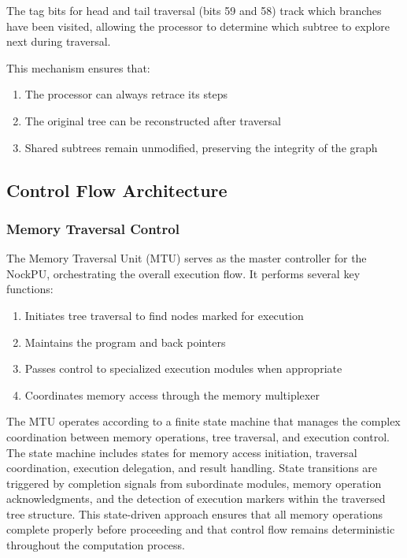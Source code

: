 \documentclass[twoside]{article}
\begin{document}
The tag bits for head and tail traversal (bits 59 and 58) track which branches have been visited, allowing the processor to determine which subtree to explore next during traversal.

This mechanism ensures that:
\begin{enumerate}
  \item The processor can always retrace its steps
  \item The original tree can be reconstructed after traversal
  \item Shared subtrees remain unmodified, preserving the integrity of the graph
\end{enumerate}

\subsection{Control Flow Architecture}

\subsubsection{Memory Traversal Control}

The Memory Traversal Unit (MTU) serves as the master controller for the NockPU, orchestrating the overall execution flow. It performs several key functions:

\begin{enumerate}
  \item Initiates tree traversal to find nodes marked for execution
  \item Maintains the program and back pointers
  \item Passes control to specialized execution modules when appropriate
  \item Coordinates memory access through the memory multiplexer
\end{enumerate}

\noindent
The MTU operates according to a finite state machine that manages the complex coordination between memory operations, tree traversal, and execution control. The state machine includes states for memory access initiation, traversal coordination, execution delegation, and result handling. State transitions are triggered by completion signals from subordinate modules, memory operation acknowledgments, and the detection of execution markers within the traversed tree structure. This state-driven approach ensures that all memory operations complete properly before proceeding and that control flow remains deterministic throughout the computation process.
\end{document}
